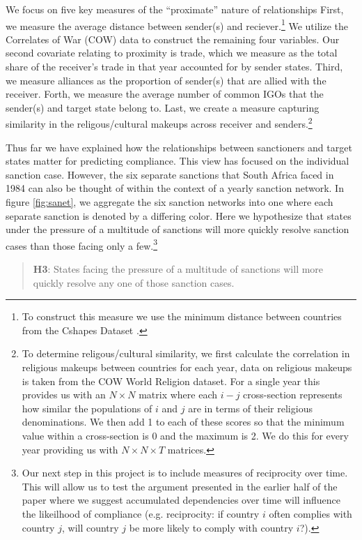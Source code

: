 We focus on five key measures of the ``proximate'' nature of relationships First, we measure the average distance between sender(s) and reciever.\footnote{To construct this measure we use the minimum distance between countries from the Cshapes Dataset \citep{weidmann2010geography}.} We utilize the Correlates of War (COW) data to construct the remaining four variables. Our second covariate relating to proximity is trade, which we measure as the total share of the receiver's trade in that year accounted for by sender states. Third, we measure alliances as the proportion of sender(s) that are allied with the receiver. Forth, we measure the average number of common IGOs that the sender(s) and target state belong to. Last, we create a measure capturing similarity in the religous/cultural makeups across receiver and senders.\footnote{To determine religous/cultural similarity, we first calculate the correlation in religious makeups between countries for each year, data on religious makeups is taken from the COW World Religion dataset. For a single year this provides us with an $N \times N$ matrix where each $i-j$ cross-section represents how similar the populations of $i$ and $j$ are in terms of their religious denominations. We then add 1 to each of these scores so that the minimum value within a cross-section is 0 and the maximum is 2. We do this for every year providing us with $N \times N \times T$ matrices.}

Thus far we have explained how the relationships between sanctioners and target states matter for predicting compliance. This view has focused on the individual sanction case. However, the six separate sanctions that South Africa faced in 1984 can also be thought of within the context of a yearly sanction network. In figure \ref{fig:sanet}, we aggregate the six sanction networks into one where each separate sanction is denoted by a differing color. Here we hypothesize that states under the pressure of a multitude of sanctions will more quickly resolve sanction cases than those facing only a few.\footnote{Our next step in this project is to include measures of reciprocity over time. This will allow us to test the argument presented in the earlier half of the paper where we suggest accumulated dependencies over time will influence the likeilhood of compliance (e.g. reciprocity: if country $i$ often complies with country $j$, will country $j$ be more likely to comply with country $i$?).}

\begin{quote}
	\textbf{H3}: States facing the pressure of a multitude of sanctions will more quickly resolve any one of those sanction cases.
\end{quote}


